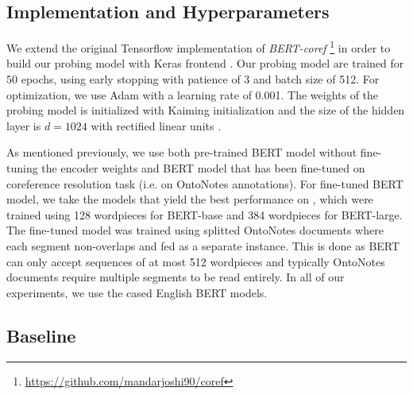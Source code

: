 \documentclass[11pt]{article}
\begin{document}
\subsection{Implementation and Hyperparameters} 

We extend the original Tensorflow implementation of \textit{BERT-coref} \footnote{\url{https://github.com/mandarjoshi90/coref}} in order to build our probing model with Keras frontend \parencite{chollet2015keras}. Our probing model are trained for 50 epochs, using early stopping with patience of 3 and batch size of 512. For optimization, we use Adam \parencite{adam} with a learning rate of 0.001. The weights of the probing model is initialized with Kaiming initialization \parencite{kaiming} and the size of the hidden layer is $d=1024$ with rectified linear units \parencite{relu}.

As mentioned previously, we use both pre-trained BERT model without fine-tuning the encoder weights and BERT model that has been fine-tuned on coreference resolution task (i.e. on OntoNotes annotations). For fine-tuned BERT model, we take the models that yield the best performance on \parencite{joshi2019coref}, which were trained using 128 wordpieces for BERT-base and 384 wordpieces for BERT-large. The fine-tuned model was trained using splitted OntoNotes documents where each segment non-overlaps and fed as a separate instance. This is done as BERT can only accept sequences of at most 512 wordpieces and typically OntoNotes documents require multiple segments to be read entirely. In all of our experiments, we use the cased English BERT models.

\subsection{Baseline}
\end{document}
